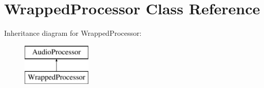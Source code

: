 \hypertarget{class_wrapped_processor}{}\section{Wrapped\+Processor Class Reference}
\label{class_wrapped_processor}
Inheritance diagram for Wrapped\+Processor\+:\begin{figure}[H]
\begin{center}
\leavevmode
\includegraphics[height=2.000000cm]{class_wrapped_processor}
\end{center}
\end{figure}
